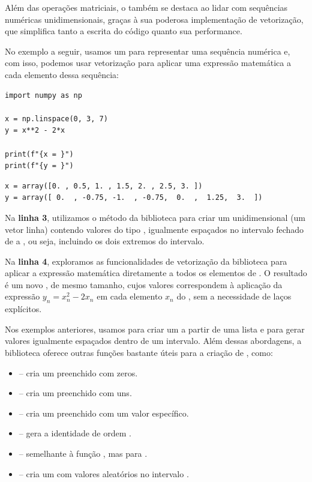 Além das operações matriciais, o  também se destaca ao lidar com sequências numéricas unidimensionais, graças à sua poderosa implementação de vetorização, que simplifica tanto a escrita do código quanto sua performance.

No exemplo a seguir, usamos um  para representar uma sequência numérica e, com isso, podemos usar
vetorização para aplicar uma expressão matemática a cada elemento dessa sequência:
\begin{verbatim}
import numpy as np

x = np.linspace(0, 3, 7)
y = x**2 - 2*x

print(f"{x = }")
print(f"{y = }")
\end{verbatim}
\begin{verbatim}
x = array([0. , 0.5, 1. , 1.5, 2. , 2.5, 3. ])
y = array([ 0.  , -0.75, -1.  , -0.75,  0.  ,  1.25,  3.  ])
\end{verbatim}

Na \textbf{linha 3}, utilizamos o método  da biblioteca  para criar um 
unidimensional (um vetor linha) contendo  valores do tipo , igualmente espaçados no intervalo fechado de  a
, ou seja, incluindo os dois extremos do intervalo.

Na \textbf{linha 4}, exploramos as funcionalidades de vetorização da biblioteca  para aplicar a
expressão matemática diretamente a todos os elementos de .
O resultado é um novo , de mesmo tamanho, cujos valores correspondem à aplicação da expressão
$y_n = x_n^2 - 2x_n$ em cada elemento $x_n$ do , sem a necessidade de laços explícitos.

Nos exemplos anteriores, usamos  para criar um  a partir de uma
lista e  para gerar valores igualmente espaçados dentro de um intervalo.
Além dessas abordagens, a biblioteca  oferece outras funções bastante úteis para a criação de
, como:
\begin{itemize}
\item []  -- cria um  preenchido com zeros.
\item []  -- cria um  preenchido com uns.
\item []  -- cria um  preenchido com um valor específico.
\item []  -- gera a  identidade de ordem .
\item []  -- semelhante à função , mas para .
\item []  -- cria um  com valores aleatórios no intervalo \inlcode{[0, 1)}.
\end{itemize}

